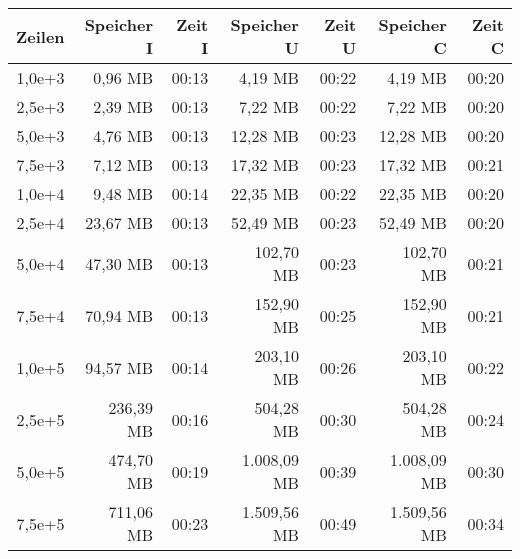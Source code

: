 \begin{table}
    \centering
    \begin{tabular}{|r|r|r|r|r|r|r|}
        \hline
        \textbf{Zeilen} & \textbf{Speicher I} & \textbf{Zeit I} & \textbf{Speicher U} & \textbf{Zeit U} & \textbf{Speicher C} & \textbf{Zeit C} \\ \hline
        1,0e+3          & 0,96 MB             & 00:13           & 4,19 MB             & 00:22           & 4,19 MB             & 00:20           \\ \hline
        2,5e+3          & 2,39 MB             & 00:13           & 7,22 MB             & 00:22           & 7,22 MB             & 00:20           \\ \hline
        5,0e+3          & 4,76 MB             & 00:13           & 12,28 MB            & 00:23           & 12,28 MB            & 00:20           \\ \hline
        7,5e+3          & 7,12 MB             & 00:13           & 17,32 MB            & 00:23           & 17,32 MB            & 00:21           \\ \hline
        1,0e+4          & 9,48 MB             & 00:14           & 22,35 MB            & 00:22           & 22,35 MB            & 00:20           \\ \hline
        2,5e+4          & 23,67 MB            & 00:13           & 52,49 MB            & 00:23           & 52,49 MB            & 00:20           \\ \hline
        5,0e+4          & 47,30 MB            & 00:13           & 102,70 MB           & 00:23           & 102,70 MB           & 00:21           \\ \hline
        7,5e+4          & 70,94 MB            & 00:13           & 152,90 MB           & 00:25           & 152,90 MB           & 00:21           \\ \hline
        1,0e+5          & 94,57 MB            & 00:14           & 203,10 MB           & 00:26           & 203,10 MB           & 00:22           \\ \hline
        2,5e+5          & 236,39 MB           & 00:16           & 504,28 MB           & 00:30           & 504,28 MB           & 00:24           \\ \hline
        5,0e+5          & 474,70 MB           & 00:19           & 1.008,09 MB         & 00:39           & 1.008,09 MB         & 00:30           \\ \hline
        7,5e+5          & 711,06 MB           & 00:23           & 1.509,56 MB         & 00:49           & 1.509,56 MB         & 00:34           \\ \hline

\end{tabular}
\end{table}

